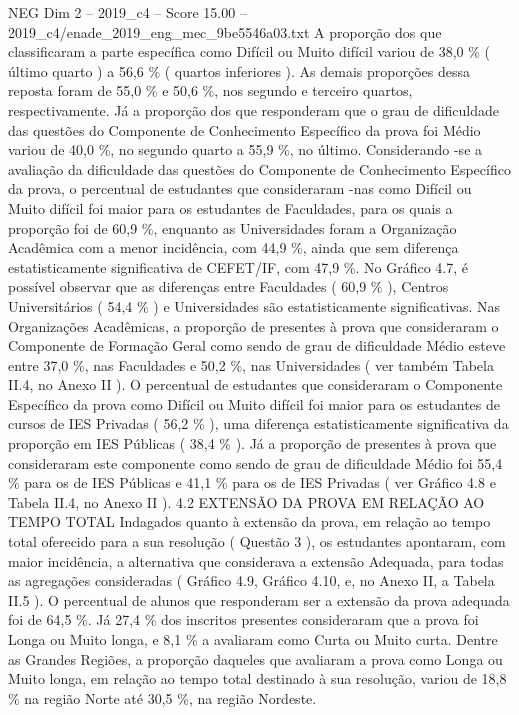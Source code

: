 \begin{textsample}{NEG Dim 2 – 2019\_c4 – Score 15.00 – 2019\_c4/enade\_2019\_eng\_mec\_9be5546a03.txt}
A proporção dos que classificaram a parte específica como Difícil ou Muito difícil variou de 38,0 \% ( último quarto ) a 56,6 \% ( quartos inferiores ).
As demais proporções dessa reposta foram de 55,0 \% e 50,6 \%, nos segundo e terceiro quartos, respectivamente.
Já a proporção dos que responderam que o grau de dificuldade das questões do Componente de Conhecimento Específico da prova foi Médio variou de 40,0 \%, no segundo quarto a 55,9 \%, no último.
Considerando -se a avaliação da dificuldade das questões do Componente de Conhecimento Específico da prova, o percentual de estudantes que consideraram -nas como Difícil ou Muito difícil foi maior para os estudantes de Faculdades, para os quais a proporção foi de 60,9 \%, enquanto as Universidades foram a Organização Acadêmica com a menor incidência, com 44,9 \%, ainda que sem diferença estatisticamente significativa de CEFET/IF, com 47,9 \%.
No Gráfico 4.7, é possível observar que as diferenças entre Faculdades ( 60,9 \% ), Centros Universitários ( 54,4 \% ) e Universidades são estatisticamente significativas.
Nas Organizações Acadêmicas, a proporção de presentes à prova que consideraram o Componente de Formação Geral como sendo de grau de dificuldade Médio esteve entre 37,0 \%, nas Faculdades e 50,2 \%, nas Universidades ( ver também Tabela II.4, no Anexo II ).
O percentual de estudantes que consideraram o Componente Específico da prova como Difícil ou Muito difícil foi maior para os estudantes de cursos de IES Privadas ( 56,2 \% ), uma diferença estatisticamente significativa da proporção em IES Públicas ( 38,4 \% ).
Já a proporção de presentes à prova que consideraram este componente como sendo de grau de dificuldade Médio foi 55,4 \% para os de IES Públicas e 41,1 \% para os de IES Privadas ( ver Gráfico 4.8 e Tabela II.4, no Anexo II ). 4.2 EXTENSÃO DA PROVA EM RELAÇÃO AO TEMPO TOTAL Indagados quanto à extensão da prova, em relação ao tempo total oferecido para a sua resolução ( Questão 3 ), os estudantes apontaram, com maior incidência, a alternativa que considerava a extensão Adequada, para todas as agregações consideradas ( Gráfico 4.9, Gráfico 4.10, e, no Anexo II, a Tabela II.5 ).
O percentual de alunos que responderam ser a extensão da prova adequada foi de 64,5 \%.
Já 27,4 \% dos inscritos presentes consideraram que a prova foi Longa ou Muito longa, e 8,1 \% a avaliaram como Curta ou Muito curta.
Dentre as Grandes Regiões, a proporção daqueles que avaliaram a prova como Longa ou Muito longa, em relação ao tempo total destinado à sua resolução, variou de 18,8 \% na região Norte até 30,5 \%, na região Nordeste.

\end{textsample}

